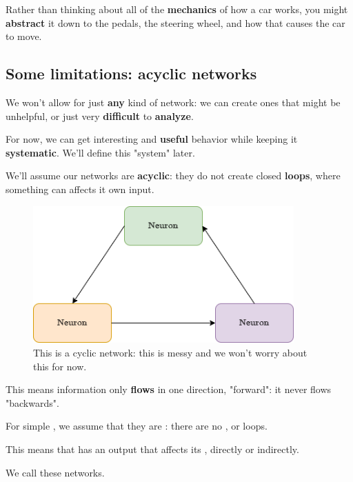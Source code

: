         \miniex Rather than thinking about all of the \textbf{mechanics} of how a car works, you might \textbf{abstract} it down to the pedals, the steering wheel, and how that causes the car to move.
    
    \subsection*{Some limitations: acyclic networks}
    
        We won't allow for just \textbf{any} kind of network: we can create ones that might be unhelpful, or just very \textbf{difficult} to \textbf{analyze}. 
        
        For now, we can get interesting and \textbf{useful} behavior while keeping it \textbf{systematic}. We'll define this "system" later.
    
        We'll assume our networks are \textbf{acyclic}: they do not create closed \textbf{loops}, where something can affects it own input.
        
        \begin{figure}[H]
            \centering
            \includegraphics[width=100mm,scale=0.4]{images/nn_images/cyclic_network.png}
            \caption*{This is a cyclic network: this is messy and we won't worry about this for now.}
        \end{figure}
        
        This means information only \textbf{flows} in one direction, "forward": it never flows "backwards".\\
        
        \begin{concept}
            For simple , we assume that they are : there are no , or loops.
            
            This means that  has an output that affects its , directly or indirectly.
            
            We call these  networks.
        \end{concept}
        
